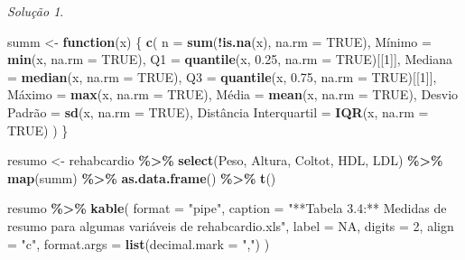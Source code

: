 \documentclass[
]{latex/krantz}
\newenvironment{Shaded}{\begin{snugshade}}{\end{snugshade}}
\newcommand{\AttributeTok}[1]{\textcolor[rgb]{0.13,0.29,0.53}{#1}}
\newcommand{\ConstantTok}[1]{\textcolor[rgb]{0.56,0.35,0.01}{#1}}
\newcommand{\ControlFlowTok}[1]{\textcolor[rgb]{0.13,0.29,0.53}{\textbf{#1}}}
\newcommand{\DecValTok}[1]{\textcolor[rgb]{0.00,0.00,0.81}{#1}}
\newcommand{\FloatTok}[1]{\textcolor[rgb]{0.00,0.00,0.81}{#1}}
\newcommand{\FunctionTok}[1]{\textcolor[rgb]{0.13,0.29,0.53}{\textbf{#1}}}
\newcommand{\NormalTok}[1]{#1}
\newcommand{\OtherTok}[1]{\textcolor[rgb]{0.56,0.35,0.01}{#1}}
\newcommand{\SpecialCharTok}[1]{\textcolor[rgb]{0.81,0.36,0.00}{\textbf{#1}}}
\newcommand{\StringTok}[1]{\textcolor[rgb]{0.31,0.60,0.02}{#1}}
\theoremstyle{definition}
\theoremstyle{definition}
\theoremstyle{definition}
\theoremstyle{definition}
\theoremstyle{remark}
\newtheorem*{solution}{Solução}
\begin{document}
\begin{solution}
\begin{Shaded}
\begin{Highlighting}[]
\NormalTok{summ }\OtherTok{\textless{}{-}} \ControlFlowTok{function}\NormalTok{(x) \{}
  \FunctionTok{c}\NormalTok{(}
    \AttributeTok{n =} \FunctionTok{sum}\NormalTok{(}\SpecialCharTok{!}\FunctionTok{is.na}\NormalTok{(x), }\AttributeTok{na.rm =} \ConstantTok{TRUE}\NormalTok{),}
    \StringTok{\textasciigrave{}}\AttributeTok{Mínimo}\StringTok{\textasciigrave{}} \OtherTok{=} \FunctionTok{min}\NormalTok{(x, }\AttributeTok{na.rm =} \ConstantTok{TRUE}\NormalTok{),}
    \AttributeTok{Q1 =} \FunctionTok{quantile}\NormalTok{(x, }\FloatTok{0.25}\NormalTok{, }\AttributeTok{na.rm =} \ConstantTok{TRUE}\NormalTok{)[[}\DecValTok{1}\NormalTok{]],}
    \StringTok{\textasciigrave{}}\AttributeTok{Mediana}\StringTok{\textasciigrave{}} \OtherTok{=} \FunctionTok{median}\NormalTok{(x, }\AttributeTok{na.rm =} \ConstantTok{TRUE}\NormalTok{),}
    \AttributeTok{Q3 =} \FunctionTok{quantile}\NormalTok{(x, }\FloatTok{0.75}\NormalTok{, }\AttributeTok{na.rm =} \ConstantTok{TRUE}\NormalTok{)[[}\DecValTok{1}\NormalTok{]],}
    \StringTok{\textasciigrave{}}\AttributeTok{Máximo}\StringTok{\textasciigrave{}} \OtherTok{=} \FunctionTok{max}\NormalTok{(x, }\AttributeTok{na.rm =} \ConstantTok{TRUE}\NormalTok{),}
    \StringTok{\textasciigrave{}}\AttributeTok{Média}\StringTok{\textasciigrave{}} \OtherTok{=} \FunctionTok{mean}\NormalTok{(x, }\AttributeTok{na.rm =} \ConstantTok{TRUE}\NormalTok{),}
    \StringTok{\textasciigrave{}}\AttributeTok{Desvio Padrão}\StringTok{\textasciigrave{}} \OtherTok{=} \FunctionTok{sd}\NormalTok{(x, }\AttributeTok{na.rm =} \ConstantTok{TRUE}\NormalTok{),}
    \StringTok{\textasciigrave{}}\AttributeTok{Distância Interquartil}\StringTok{\textasciigrave{}} \OtherTok{=} \FunctionTok{IQR}\NormalTok{(x, }\AttributeTok{na.rm =} \ConstantTok{TRUE}\NormalTok{)}
\NormalTok{  )}
\NormalTok{\}}

\NormalTok{resumo }\OtherTok{\textless{}{-}}\NormalTok{ rehabcardio }\SpecialCharTok{\%\textgreater{}\%}
            \FunctionTok{select}\NormalTok{(Peso, Altura, Coltot, HDL, LDL) }\SpecialCharTok{\%\textgreater{}\%}
            \FunctionTok{map}\NormalTok{(summ) }\SpecialCharTok{\%\textgreater{}\%}
            \FunctionTok{as.data.frame}\NormalTok{() }\SpecialCharTok{\%\textgreater{}\%}
            \FunctionTok{t}\NormalTok{()}

\NormalTok{resumo }\SpecialCharTok{\%\textgreater{}\%}
  \FunctionTok{kable}\NormalTok{(}
    \AttributeTok{format =} \StringTok{"pipe"}\NormalTok{,}
    \AttributeTok{caption =} \StringTok{"**Tabela 3.4:** Medidas de resumo para algumas variáveis de \textasciigrave{}rehabcardio.xls\textasciigrave{}"}\NormalTok{,}
    \AttributeTok{label =} \ConstantTok{NA}\NormalTok{,}
    \AttributeTok{digits =} \DecValTok{2}\NormalTok{,}
    \AttributeTok{align =} \StringTok{"c"}\NormalTok{,}
    \AttributeTok{format.args =} \FunctionTok{list}\NormalTok{(}\AttributeTok{decimal.mark =} \StringTok{","}\NormalTok{)}
\NormalTok{  )}
\end{Highlighting}
\end{Shaded}


\end{solution}
\end{document}
